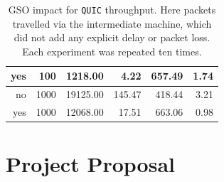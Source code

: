 \documentclass[12pt,a4paper]{report}
\begin{document}
\begin{table}[H]
\begin{tabular}{|r|r|r|r|r|r|}
yes                                                                             & 100                                                                                            & 1218.00                                                                                               & 4.22                                                                                                                                & 657.49                                                                                                                                     & 1.74                                                                                                                              \\ \hline
no                                                                              & 1000                                                                                           & 19125.00                                                                                              & 145.47                                                                                                                              & 418.44                                                                                                                                     & 3.21                                                                                                                              \\ \hline
yes                                                                             & 1000                                                                                           & 12068.00                                                                                              & 17.51                                                                                                                               & 663.06                                                                                                                                     & 0.98                                                                                                                              \\ \hline
\end{tabular}
    \centering
    \caption[GSO impact for \texttt{QUIC} throughput]{GSO impact for \texttt{QUIC} throughput. Here packets travelled via the intermediate machine, which did not add any explicit delay or packet loss. Each experiment was repeated ten times.}
    \label{GSO_impact_measurement_results}
\end{table}

\chapter{Project Proposal}

 
\end{document}
